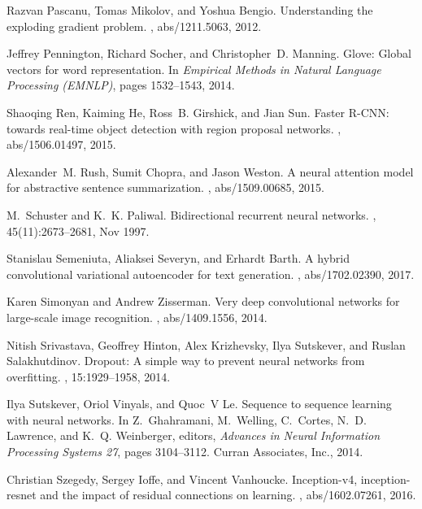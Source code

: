 \documentclass{article}
\begin{document}
\begin{thebibliography}{10}
Razvan Pascanu, Tomas Mikolov, and Yoshua Bengio.
\newblock Understanding the exploding gradient problem.
, abs/1211.5063, 2012.

Jeffrey Pennington, Richard Socher, and Christopher~D. Manning.
\newblock Glove: Global vectors for word representation.
\newblock In {\em Empirical Methods in Natural Language Processing (EMNLP)},
  pages 1532--1543, 2014.

Shaoqing Ren, Kaiming He, Ross~B. Girshick, and Jian Sun.
\newblock Faster {R-CNN:} towards real-time object detection with region
  proposal networks.
, abs/1506.01497, 2015.

Alexander~M. Rush, Sumit Chopra, and Jason Weston.
\newblock A neural attention model for abstractive sentence summarization.
, abs/1509.00685, 2015.

M.~Schuster and K.~K. Paliwal.
\newblock Bidirectional recurrent neural networks.
, 45(11):2673--2681, Nov
  1997.

Stanislau Semeniuta, Aliaksei Severyn, and Erhardt Barth.
\newblock A hybrid convolutional variational autoencoder for text generation.
, abs/1702.02390, 2017.

Karen Simonyan and Andrew Zisserman.
\newblock Very deep convolutional networks for large-scale image recognition.
, abs/1409.1556, 2014.

Nitish Srivastava, Geoffrey Hinton, Alex Krizhevsky, Ilya Sutskever, and Ruslan
  Salakhutdinov.
\newblock Dropout: A simple way to prevent neural networks from overfitting.
, 15:1929--1958, 2014.

Ilya Sutskever, Oriol Vinyals, and Quoc~V Le.
\newblock Sequence to sequence learning with neural networks.
\newblock In Z.~Ghahramani, M.~Welling, C.~Cortes, N.~D. Lawrence, and K.~Q.
  Weinberger, editors, {\em Advances in Neural Information Processing Systems
  27}, pages 3104--3112. Curran Associates, Inc., 2014.

Christian Szegedy, Sergey Ioffe, and Vincent Vanhoucke.
\newblock Inception-v4, inception-resnet and the impact of residual connections
  on learning.
, abs/1602.07261, 2016.


\end{thebibliography}
\end{document}

